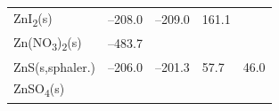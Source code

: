 \documentclass[
  9pt,
]{extbook}
\theoremstyle{definition}
\theoremstyle{definition}
\theoremstyle{definition}
\theoremstyle{remark}
\begin{document}
\begin{longtable}[]{@{}lllll@{}}
\begin{minipage}[t]{0.10\columnwidth}
ZnI\textsubscript{2}(s)\strut
\end{minipage} & \begin{minipage}[t]{0.19\columnwidth}\raggedright
--208.0\strut
\end{minipage} & \begin{minipage}[t]{0.20\columnwidth}\raggedright
--209.0\strut
\end{minipage} & \begin{minipage}[t]{0.18\columnwidth}\raggedright
161.1\strut
\end{minipage} & \begin{minipage}[t]{0.18\columnwidth}\raggedright
\strut
\end{minipage}\tabularnewline
\begin{minipage}[t]{0.10\columnwidth}\raggedright
Zn(NO\textsubscript{3})\textsubscript{2}(s)\strut
\end{minipage} & \begin{minipage}[t]{0.19\columnwidth}\raggedright
--483.7\strut
\end{minipage} & \begin{minipage}[t]{0.20\columnwidth}\raggedright
\strut
\end{minipage} & \begin{minipage}[t]{0.18\columnwidth}\raggedright
\strut
\end{minipage} & \begin{minipage}[t]{0.18\columnwidth}\raggedright
\strut
\end{minipage}\tabularnewline
\begin{minipage}[t]{0.10\columnwidth}\raggedright
ZnS(s,sphaler.)\strut
\end{minipage} & \begin{minipage}[t]{0.19\columnwidth}\raggedright
--206.0\strut
\end{minipage} & \begin{minipage}[t]{0.20\columnwidth}\raggedright
--201.3\strut
\end{minipage} & \begin{minipage}[t]{0.18\columnwidth}\raggedright
57.7\strut
\end{minipage} & \begin{minipage}[t]{0.18\columnwidth}\raggedright
46.0\strut
\end{minipage}\tabularnewline
\begin{minipage}[t]{0.10\columnwidth}\raggedright
ZnSO\textsubscript{4}(s)\strut
\end{minipage} & \begin{minipage}[t]{0.19\columnwidth}\raggedright

\end{minipage}
\end{longtable}
\end{document}
